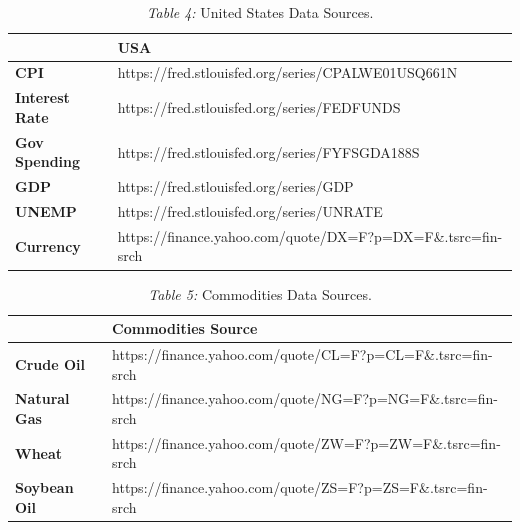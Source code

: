 \documentclass[11pt,regno]{amsart}
\theoremstyle{plain}
\numberwithin{equation}{section}
\begin{document}
\begin{table}[]
\caption*{\textit{Table 4:} United States Data Sources.}
\begin{tabular}{|l|l|}
\hline
                       & \textbf{USA}                                                \\ \hline
\textbf{CPI}           & https://fred.stlouisfed.org/series/CPALWE01USQ661N          \\ \hline
\textbf{Interest Rate} & https://fred.stlouisfed.org/series/FEDFUNDS                 \\ \hline
\textbf{Gov Spending}  & https://fred.stlouisfed.org/series/FYFSGDA188S              \\ \hline
\textbf{GDP}           & https://fred.stlouisfed.org/series/GDP                      \\ \hline
\textbf{UNEMP}         & https://fred.stlouisfed.org/series/UNRATE                   \\ \hline
\textbf{Currency}      & https://finance.yahoo.com/quote/DX=F?p=DX=F\&.tsrc=fin-srch \\ \hline
\end{tabular}
\end{table}

\begin{table}[]
\caption*{\textit{Table 5:} Commodities Data Sources.}
\begin{tabular}{|l|l|}
\hline
                     & \textbf{Commodities Source}                                             \\ \hline
\textbf{Crude Oil}   & https://finance.yahoo.com/quote/CL=F?p=CL=F\&.tsrc=fin-srch \\ \hline
\textbf{Natural Gas} & https://finance.yahoo.com/quote/NG=F?p=NG=F\&.tsrc=fin-srch \\ \hline
\textbf{Wheat}       & https://finance.yahoo.com/quote/ZW=F?p=ZW=F\&.tsrc=fin-srch \\ \hline
\textbf{Soybean Oil} & https://finance.yahoo.com/quote/ZS=F?p=ZS=F\&.tsrc=fin-srch \\ \hline
\end{tabular}
\end{table}

\

\

\
\end{document}

